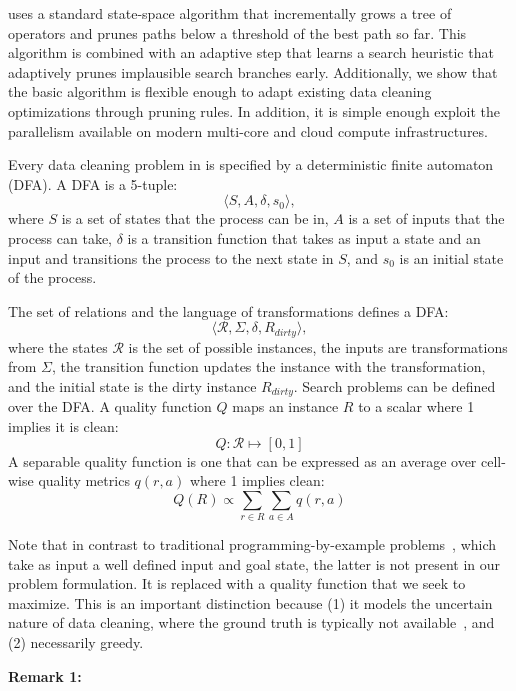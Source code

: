 \sys uses a standard state-space algorithm that incrementally grows a tree of operators and prunes paths below a threshold of the best path so far. 
This algorithm is combined with an adaptive step that learns a search heuristic that adaptively prunes implausible search branches early.
Additionally, we show that the basic algorithm is flexible enough to adapt existing data cleaning optimizations through pruning rules.  In addition, it is simple enough exploit the parallelism available on modern multi-core and cloud compute infrastructures.








    Every data cleaning problem in \sys is specified by a deterministic finite automaton (DFA). 
    A DFA is a 5-tuple:
    \[\langle S, A, \delta, s_0\rangle,\]
    where $S$ is a set of states that the process can be in, $A$ is a set of inputs that the process can take, $\delta$ is a transition function that takes as input a state and an input and transitions the process to the next state in $S$, and $s_0$ is an initial state of the process.

    The set of relations and the language of transformations defines a DFA:
    \[\langle \mathcal{R}, \Sigma, \delta, R_{dirty}\rangle, \]
    where the states $\mathcal{R}$ is the set of possible instances, the inputs are transformations from $\Sigma$, the transition function updates the instance with the transformation, and the initial state is the dirty instance $R_{dirty}$. Search problems can be defined over the DFA. 
    A quality function $Q$ maps an instance $R$ to a scalar where 1 implies it is clean:
    \[
    Q: \mathcal{R} \mapsto [0,1]
    \]
    A separable quality function is one that can be expressed as an average over cell-wise quality metrics $q(r,a)$ where 1 implies clean:
    \[
    Q(R) \propto \sum_{r \in R} \sum_{a \in A} q(r,a)
    \]

    Note that in contrast to traditional programming-by-example problems~\cite{}, which take as input a well defined input and goal state, the latter is not present in our problem formulation.  It is replaced with a quality function that we seek to maximize.  This is an important distinction because (1) it models the uncertain nature of data cleaning, where the ground truth is typically not available~\cite{}, and (2) necessarily greedy.

    \vspace{0.5em} \noindent \textbf{Remark 1: } 



\fi







